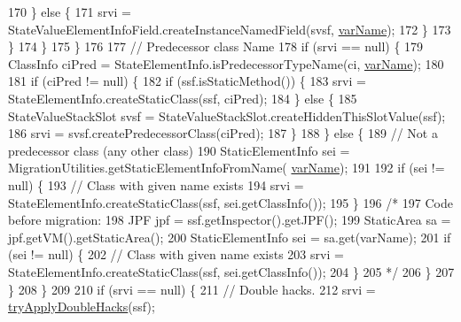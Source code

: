 \begin{DoxyCode}
170             \} \textcolor{keywordflow}{else} \{
171               srvi = StateValueElementInfoField.createInstanceNamedField(svsf, 
      \hyperlink{classgov_1_1nasa_1_1jpf_1_1inspector_1_1server_1_1expression_1_1expressions_1_1_expression_state_value_name_a5861f8633f2b17e241b6c108a5671be3}{varName});
172             \}
173           \}
174         \}
175       \}
176 
177       \textcolor{comment}{// Predecessor class Name}
178       \textcolor{keywordflow}{if} (srvi == null) \{
179         ClassInfo ciPred = StateElementInfo.isPredecessorTypeName(ci, \hyperlink{classgov_1_1nasa_1_1jpf_1_1inspector_1_1server_1_1expression_1_1expressions_1_1_expression_state_value_name_a5861f8633f2b17e241b6c108a5671be3}{varName});
180 
181         \textcolor{keywordflow}{if} (ciPred != null) \{
182           \textcolor{keywordflow}{if} (ssf.isStaticMethod()) \{
183             srvi = StateElementInfo.createStaticClass(ssf, ciPred);
184           \} \textcolor{keywordflow}{else} \{
185             StateValueStackSlot svsf = StateValueStackSlot.createHiddenThisSlotValue(ssf);
186             srvi = svsf.createPredecessorClass(ciPred);
187           \}
188         \} \textcolor{keywordflow}{else} \{
189           \textcolor{comment}{// Not a predecessor class (any other class)}
190           StaticElementInfo sei = MigrationUtilities.getStaticElementInfoFromName(
      \hyperlink{classgov_1_1nasa_1_1jpf_1_1inspector_1_1server_1_1expression_1_1expressions_1_1_expression_state_value_name_a5861f8633f2b17e241b6c108a5671be3}{varName});
191 
192           \textcolor{keywordflow}{if} (sei != null) \{
193             \textcolor{comment}{// Class with given name exists}
194             srvi = StateElementInfo.createStaticClass(ssf, sei.getClassInfo());
195           \}
196           \textcolor{comment}{/*}
197 \textcolor{comment}{          Code before migration:}
198 \textcolor{comment}{          JPF jpf = ssf.getInspector().getJPF();}
199 \textcolor{comment}{          StaticArea sa = jpf.getVM().getStaticArea();}
200 \textcolor{comment}{          StaticElementInfo sei = sa.get(varName);}
201 \textcolor{comment}{          if (sei != null) \{}
202 \textcolor{comment}{            // Class with given name exists}
203 \textcolor{comment}{            srvi = StateElementInfo.createStaticClass(ssf, sei.getClassInfo());}
204 \textcolor{comment}{          \}}
205 \textcolor{comment}{           */}
206         \}
207       \}
208     \}
209 
210     \textcolor{keywordflow}{if} (srvi == null) \{
211       \textcolor{comment}{// Double hacks.}
212       srvi = \hyperlink{classgov_1_1nasa_1_1jpf_1_1inspector_1_1server_1_1expression_1_1expressions_1_1_expression_state_value_name_a31818b0fc77a1e9504c48d24dffcbd59}{tryApplyDoubleHacks}(ssf);

\end{DoxyCode}
